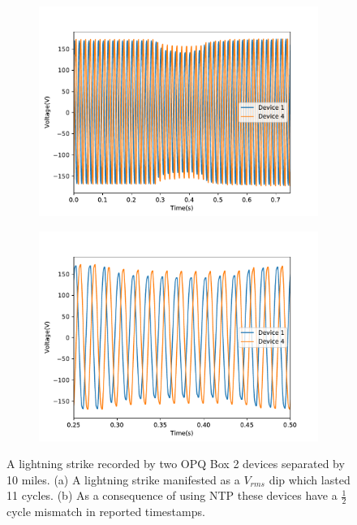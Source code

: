 \begin{figure}[ht]
		\centering
	\begin{subfigure}{.5\textwidth}
	  \centering
	  \includegraphics[width=0.9\linewidth]{images/opq-box/voltage_sag.pdf}
	  \caption{}
	  \label{fig:opq:6:1}
	\end{subfigure}%
	\begin{subfigure}{.5\textwidth}
	  \centering
	  \includegraphics[width=0.9\linewidth]{images/opq-box/voltage_sag_zoomed_in.pdf}
	  \caption{}
	  \label{fig:opq:6:2}
	\end{subfigure}
	\caption{A lightning strike recorded by two OPQ Box 2 devices separated by 10 miles. (a) A lightning strike manifested as a $V_{rms}$ dip which lasted 11 cycles. (b) As a consequence of using NTP these devices have a $\frac{1}{2}$ cycle mismatch in reported timestamps.}
	\label{fig:opq:6}
\end{figure}


